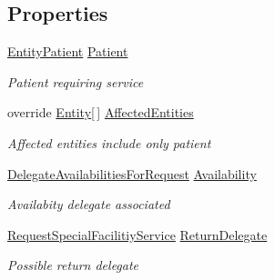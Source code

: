 \subsection*{Properties}
\begin{DoxyCompactItemize}
\item 
\hyperlink{class_general_health_care_elements_1_1_entities_1_1_entity_patient}{Entity\+Patient} \hyperlink{class_general_health_care_elements_1_1_special_facility_1_1_event_booking_special_service_due_a571b4adc4f938f80977c70bba17cf5ea}{Patient}
\begin{DoxyCompactList}\small\item\em Patient requiring service \end{DoxyCompactList}\item 
override \hyperlink{class_simulation_core_1_1_h_c_c_m_elements_1_1_entity}{Entity}\mbox{[}$\,$\mbox{]} \hyperlink{class_general_health_care_elements_1_1_special_facility_1_1_event_booking_special_service_due_a93488b67aa1dfd68da7f30e674e91412}{Affected\+Entities}
\begin{DoxyCompactList}\small\item\em Affected entities include only patient \end{DoxyCompactList}\item 
\hyperlink{class_general_health_care_elements_1_1_special_facility_1_1_delegate_availabilities_for_request}{Delegate\+Availabilities\+For\+Request} \hyperlink{class_general_health_care_elements_1_1_special_facility_1_1_event_booking_special_service_due_acc57e1fd9342c9ada926af475b5c264c}{Availability}
\begin{DoxyCompactList}\small\item\em Availabity delegate associated \end{DoxyCompactList}\item 
\hyperlink{class_general_health_care_elements_1_1_special_facility_1_1_request_special_facilitiy_service}{Request\+Special\+Facilitiy\+Service} \hyperlink{class_general_health_care_elements_1_1_special_facility_1_1_event_booking_special_service_due_a00a1a13a9e317e70d85e00ab2634b06b}{Return\+Delegate}
\begin{DoxyCompactList}\small\item\em Possible return delegate \end{DoxyCompactList}\end{DoxyCompactItemize}


